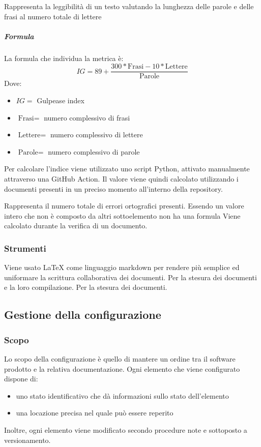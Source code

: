         Rappresenta la leggibilità di un testo valutando la lunghezza delle parole e delle frasi al numero totale di lettere
        \subparagraph{Formula}
        La formula che individua la metrica è:
        \begin{displaymath}
        \textit{IG} = 89 + \frac{300 * \textrm{Frasi} - 10* \textrm{Lettere}}{\textrm{Parole}}
        \end{displaymath}
        Dove:
        \begin{itemize}
        \item[] $IG =$ Gulpease index
        \item[] $\textrm{Frasi} =$ numero complessivo di frasi
        \item[] $\textrm{Lettere} =$ numero complessivo di lettere
        \item[] $\textrm{Parole} =$ numero complessivo di parole
        \end{itemize}
        Per calcolare l'indice viene utilizzato uno script Python, attivato manualmente attraverso una GitHub Action. Il valore viene quindi calcolato utilizzando i documenti presenti in un preciso momento all'interno della repository.
        
        Rappresenta il numero totale di errori ortografici presenti. Essendo un valore intero che non è composto da altri sottoelemento non ha una formula
        Viene calcolato durante la verifica di un documento.
	    
	    
	    \subsubsection{Strumenti}
	    Viene usato LaTeX come linguaggio markdown per rendere più semplice ed uniformare la scrittura collaborativa dei documenti.
	    Per la stesura dei documenti e la loro compilazione.
	    Per la stesura dei documenti.

	\subsection{Gestione della configurazione}
		
		\subsubsection{Scopo}
		Lo scopo della configurazione è quello di mantere un ordine tra il software prodotto e la relativa documentazione. Ogni elemento che viene configurato dispone di:
			\begin{itemize}
				\item uno stato identificativo che dà informazioni sullo stato dell'elemento
				\item una locazione precisa nel quale può essere reperito
			\end{itemize}
		Inoltre, ogni elemento viene modificato secondo procedure note e sottoposto a versionamento.
		
